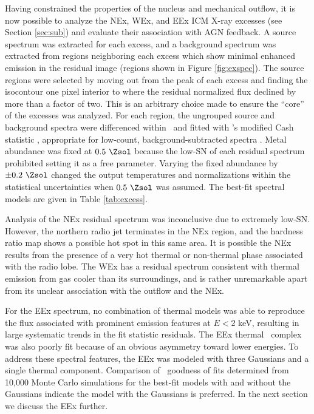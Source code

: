 \documentclass[useAMS,usenatbib]{mn2e}
\begin{document}
Having constrained the properties of the nucleus and mechanical
outflow, it is now possible to analyze the NEx, WEx, and EEx ICM X-ray
excesses (see Section \ref{sec:sub}) and evaluate their association
with AGN feedback. A source spectrum was extracted for each excess,
and a background spectrum was extracted from regions neighboring each
excess which show minimal enhanced emission in the residual image
(regions shown in Figure \ref{fig:exspec}). The source regions were
selected by moving out from the peak of each excess and finding the
isocontour one pixel interior to where the residual normalized flux
declined by more than a factor of two. This is an arbitrary choice
made to ensure the ``core'' of the excesses was analyzed. For each
region, the ungrouped source and background spectra were differenced
within \xspec\ and fitted with \xspec's modified Cash statistic
\citep{1979ApJ...228..939C}, appropriate for low-count,
background-subtracted spectra \citep[see \xspec\ Manual Appendix B
  and][]{1989ApJ...342.1207N}. Metal abundance was fixed at $0.5
~\Zsol$ because the low-SN of each residual spectrum prohibited
setting it as a free parameter. Varying the fixed abundance by $\pm
0.2 ~\Zsol$ changed the output temperatures and normalizations within
the statistical uncertainties when $0.5 ~\Zsol$ was assumed. The
best-fit spectral models are given in Table \ref{tab:excess}.

Analysis of the NEx residual spectrum was inconclusive due to
extremely low-SN. However, the northern radio jet terminates in the
NEx region, and the hardness ratio map shows a possible hot spot in
this same area. It is possible the NEx results from the presence of a
very hot thermal or non-thermal phase associated with the radio
lobe. The WEx has a residual spectrum consistent with thermal emission
from gas cooler than its surroundings, and is rather unremarkable
apart from its unclear association with the outflow and the NEx.

For the EEx spectrum, no combination of thermal models was able to
reproduce the flux associated with prominent emission features at $E <
2$ keV, resulting in large systematic trends in the fit statistic
residuals. The EEx thermal \feka\ complex was also poorly fit because
of an obvious asymmetry toward lower energies. To address these
spectral features, the EEx was modeled with three Gaussians and a
single thermal component. Comparison of \chisq\ goodness of fits
determined from 10,000 Monte Carlo simulations for the best-fit models
with and without the Gaussians indicate the model with the Gaussians
is preferred. In the next section we discuss the EEx further.
\end{document}
